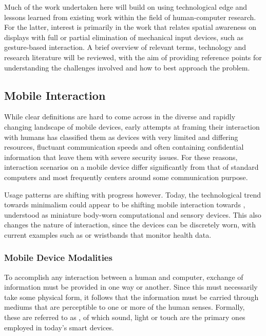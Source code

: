 	
\noi Much of the work undertaken here will build on using technological edge and lessons learned from existing work within the field of human-computer research. For the latter, interest is primarily in the work that relates spatial awareness on displays with full or partial elimination of mechanical input devices, such as gesture-based interaction. A brief overview of relevant terms, technology and research literature   will be reviewed, with the aim of providing reference points for understanding the challenges involved and how to best approach the problem.\\ %


\subsection{Mobile Interaction}

While clear definitions are hard to come across in the diverse and rapidly changing landscape of mobile devices, early attempts\cite{MobileInteractionDef} at framing their interaction with humans has classified them as devices with very limited and differing resources, fluctuant communication speeds and often containing confidential information that leave them with severe security issues. For these reasons, interaction scenarios on a mobile device differ significantly from that of standard computers and most frequently centers around some communication purpose.

Usage patterns are shifting with progress however. Today, the technological trend towards minimalism could  appear to be shifting mobile interaction  towards , understood as miniature body-worn computational and sensory devices\cite{WearComp}. This also changes the nature of interaction, since the devices can be discretely worn, with current examples such as   or wristbands that monitor health data.

\subsubsection{Mobile Device Modalities}

To accomplish any interaction between a human and computer,  exchange of  information must be provided in one way or another. Since this must necessarily take some physical form, it follows that the information must be carried through mediums that are  perceptible to one or more of the human senses. Formally, these  are referred to as \cite{Modalities}, of which sound, light or touch are the primary ones employed in today's smart devices.

